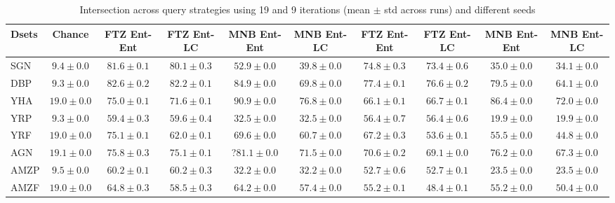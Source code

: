 \documentclass[11pt,a4paper]{article}
\begin{document}
\begin{table*}[t]
\small\addtolength{\tabcolsep}{-4.5pt}
\begin{tabular}{|l|c||c|c|c|c||c|c|c|c||}
\hline
Dsets & Chance & FTZ Ent-Ent & FTZ Ent-LC & MNB Ent-Ent & MNB Ent-LC   & FTZ Ent-Ent & FTZ Ent-LC & MNB Ent-Ent & MNB Ent-LC \\ \hline
 SGN & $9.4 \pm 0.0$ & $81.6 \pm 0.1$  & $80.1 \pm 0.3$ & $52.9 \pm 0.0$ & $39.8 \pm 0.0$  & $74.8 \pm 0.3$  & $73.4 \pm 0.6$ & $35.0 \pm 0.0$ & $34.1 \pm 0.0$ \\ \hline 
DBP & $9.3 \pm 0.0$ & $82.6 \pm 0.2$  & $82.2 \pm 0.1$ & $84.9 \pm 0.0$ & $69.8 \pm 0.0$ & $77.4 \pm 0.1$  & $76.6 \pm 0.2$ & $79.5 \pm 0.0$ & $64.1 \pm 0.0$ \\ \hline 
  YHA & $19.0 \pm 0.0$ & $75.0 \pm 0.1$  & $71.6 \pm 0.1$ & $90.9 \pm 0.0$ & $76.8 \pm 0.0$  & $66.1 \pm 0.1$ & $66.7 \pm 0.1$ & $86.4 \pm 0.0$ & $72.0 \pm 0.0$ \\ \hline 
  YRP & $9.3 \pm 0.0$ & $59.4 \pm 0.3$  & $59.6 \pm 0.4$ & $32.5 \pm 0.0$ & $32.5 \pm 0.0$  & $56.4 \pm 0.7$  & $56.4 \pm 0.6$ & $19.9 \pm 0.0$ & $19.9 \pm 0.0$\\ \hline 
  YRF & $19.0 \pm 0.0$ & $75.1 \pm 0.1$  & $62.0 \pm 0.1$ & $69.6 \pm 0.0$ & $60.7 \pm 0.0$  & $67.2 \pm 0.3$  & $53.6 \pm 0.1$ & $55.5 \pm 0.0$ & $44.8 \pm 0.0$\\ \hline 
  AGN  & $19.1 \pm 0.0$ & $75.8 \pm 0.3$  & $75.1 \pm 0.1$ & ?$81.1 \pm 0.0$ & $71.5 \pm 0.0$   & $70.6 \pm 0.2$  & $69.1 \pm 0.0$ & $76.2 \pm 0.0$ & $67.3 \pm 0.0$ \\ \hline 
  AMZP & $9.5 \pm 0.0$ & $60.2 \pm 0.1$  & $60.2 \pm 0.3$ & $32.2 \pm 0.0$ & $32.2 \pm 0.0$  & $52.7 \pm 0.6$ & $52.7 \pm 0.1$ & $23.5 \pm 0.0$ & $23.5 \pm 0.0$ \\ \hline 
  AMZF & $19.0 \pm 0.0$ & $64.8 \pm 0.3$ & $58.5 \pm 0.3$ & $64.2 \pm 0.0$ & $57.4 \pm 0.0$  & $55.2 \pm 0.1$  & $48.4 \pm 0.1$ & $55.2 \pm 0.0$ & $50.4 \pm 0.0$\\ \hline 
\end{tabular}
\caption{Intersection across query strategies using 19 and 9 iterations (mean $\pm$ std across runs) and different seeds} 
\label{tab:query_acquisition}
\end{table*}
\end{document}
